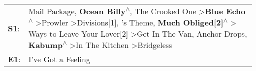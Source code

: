 \begin{supertabular}{p{0.03\textwidth}p{0.92\textwidth}}
 \textbf{S1}:  &  Mail Package\textsuperscript{}, \enspace \textbf{Ocean Billy\textsuperscript{$\wedge$}}, \enspace The Crooked One\textsuperscript{} \textgreater \enspace \textbf{Blue Echo\textsuperscript{$\wedge$}} \textgreater \enspace Prowler\textsuperscript{} \textgreater \enspace Divisions[1]\textsuperscript{}, 's Theme\textsuperscript{}, \enspace \textbf{Much Obliged[2]\textsuperscript{$\wedge$}} \textgreater {} Ways to Leave Your Lover[2]\textsuperscript{} \textgreater \enspace Get In The Van\textsuperscript{}, \enspace Anchor Drops\textsuperscript{}, \enspace \textbf{Kabump\textsuperscript{$\wedge$}} \textgreater \enspace In The Kitchen\textsuperscript{} \textgreater \enspace Bridgeless\textsuperscript{}  \enspace  \\
 \textbf{E1}:  &                                                                                                                                                                                                                                                                                                                                                                                                                                                                                                                                                                                                                                                                                                                  I've Got a Feeling\textsuperscript{}  \enspace  \\
\end{supertabular}
